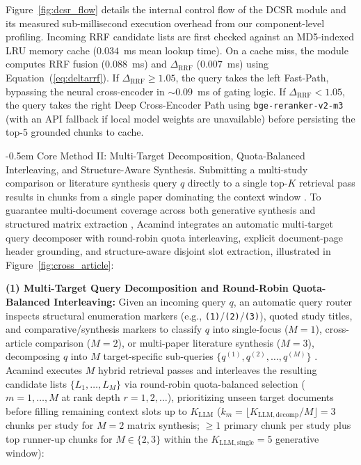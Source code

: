 \documentclass[10pt]{SPIIRAS_Proceedings}
\makeatletter
\renewcommand\subsection{\@startsection{subsection}{2}{\parindent}%
  {\z@}%
  {-0.5em}%
  {\normalfont\normalsize\bfseries}}
\makeatother
\begin{document}
Figure~\ref{fig:dcsr_flow} details the internal control flow of the DCSR module and its measured sub-millisecond execution overhead from our component-level profiling. Incoming RRF candidate lists are first checked against an MD5-indexed LRU memory cache ($0.034$~ms mean lookup time). On a cache miss, the module computes RRF fusion ($0.088$~ms) and $\Delta_{\mathrm{RRF}}$ ($0.007$~ms) using Equation~(\ref{eq:deltarrf}). If $\Delta_{\mathrm{RRF}} \ge 1.05$, the query takes the left Fast-Path, bypassing the neural cross-encoder in $\sim 0.09$~ms of gating logic. If $\Delta_{\mathrm{RRF}} < 1.05$, the query takes the right Deep Cross-Encoder Path using \texttt{bge-reranker-v2-m3} (with an API fallback if local model weights are unavailable) before persisting the top-5 grounded chunks to cache.

\subsection{Core Method II: Multi-Target Decomposition, Quota-Balanced Interleaving, and Structure-Aware Synthesis.} Submitting a multi-study comparison or literature synthesis query $q$ directly to a single top-$K$ retrieval pass results in chunks from a single paper dominating the context window \cite{izacard2021leveraging,gao2024modular}. To guarantee multi-document coverage across both generative synthesis and structured matrix extraction \cite{skarlinski2024language}, Acamind integrates an automatic multi-target query decomposer with round-robin quota interleaving, explicit document-page header grounding, and structure-aware disjoint slot extraction, illustrated in Figure~\ref{fig:cross_article}:

\textbf{(1) Multi-Target Query Decomposition and Round-Robin Quota-Balanced Interleaving:} Given an incoming query $q$, an automatic query router inspects structural enumeration markers (e.g., \texttt{(1)}/\texttt{(2)}/\texttt{(3)}), quoted study titles, and comparative/synthesis markers to classify $q$ into single-focus ($M = 1$), cross-article comparison ($M = 2$), or multi-paper literature synthesis ($M = 3$), decomposing $q$ into $M$ target-specific sub-queries $\{q^{(1)}, q^{(2)}, \dots, q^{(M)}\}$ \cite{gao2024modular}. Acamind executes $M$ hybrid retrieval passes and interleaves the resulting candidate lists $\{L_1, \dots, L_M\}$ via round-robin quota-balanced selection ($m = 1, \dots, M$ at rank depth $r = 1, 2, \dots$), prioritizing unseen target documents before filling remaining context slots up to $K_{\mathrm{LLM}}$ ($k_m = \lfloor K_{\mathrm{LLM, decomp}} / M \rfloor = 3$ chunks per study for $M = 2$ matrix synthesis; $\ge 1$ primary chunk per study plus top runner-up chunks for $M \in \{2, 3\}$ within the $K_{\mathrm{LLM, single}} = 5$ generative window):
\end{document}

